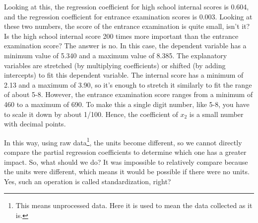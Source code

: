 \documentclass{ltjbook}
\begin{document}
Looking at this, the regression coefficient for high school internal scores is 0.604, and the regression coefficient for entrance examination scores is 0.003. Looking at these two numbers, the score of the entrance examination is quite small, isn't it? Is the high school internal score 200 times more important than the entrance examination score? The answer is no. In this case, the dependent variable has a minimum value of 5.340 and a maximum value of 8.385. The explanatory variables are stretched (by multiplying coefficients) or shifted (by adding intercepts) to fit this dependent variable. The internal score has a minimum of 2.13 and a maximum of 3.90, so it's enough to stretch it similarly to fit the range of about 5-8. However, the entrance examination score ranges from a minimum of 460 to a maximum of 690. To make this a single digit number, like 5-8, you have to scale it down by about 1/100. Hence, the coefficient of $x_2$ is a small number with decimal points.

In this way, using raw data\footnote{This means unprocessed data. Here it is used to mean the data collected as it is.}, the units become different, so we cannot directly compare the partial regression coefficients to determine which one has a greater impact. So, what should we do? It was impossible to relatively compare because the units were different, which means it would be possible if there were no units. Yes, such an operation is called standardization, right?
\end{document}

